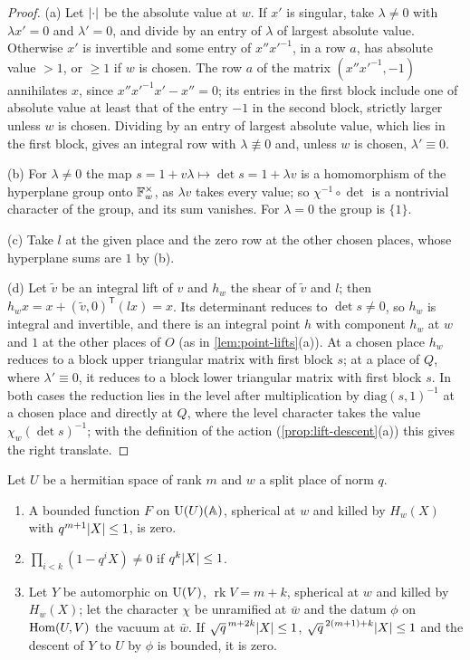 \begin{proof}
(a) Let $\lvert \cdot\rvert$ be the absolute value at $w$. If $x'$ is singular, take $\lambda\ne0$ with $\lambda x'=0$ and $\lambda'=0$, and divide by an entry of $\lambda$ of largest absolute value. Otherwise $x'$ is invertible and
some entry of $x''x'^{-1}$, in a row $a$, has absolute value $>1$, or $\ge1$ if $w$ is chosen. The row $a$ of the matrix $(x''x'^{-1},-1)$ annihilates $x$, since $x''x'^{-1}x'-x''=0$; its entries in the first block include
one of absolute value at least that of the entry $-1$ in the second block, strictly larger unless $w$ is chosen. Dividing by an entry of largest absolute value, which lies in the first block, gives an integral
row with $\lambda\not\equiv0$ and, unless $w$ is chosen, $\lambda'\equiv0$.

(b) For $\lambda\ne0$ the map $s=1+v\lambda\mapsto\det s=1+\lambda v$ is a homomorphism of the hyperplane group onto $\mathbb{F}_w^\times$, as $\lambda v$ takes every value; so $\chi^{-1}\circ\det$ is a nontrivial character of the group,
and its sum vanishes. For $\lambda=0$ the group is $\{1\}$.

(c) Take $l$ at the given place and the zero row at the other chosen places, whose hyperplane sums are $1$ by (b).

(d) Let $\tilde v$ be an integral lift of $v$ and $h_w$ the shear of $\tilde v$ and $l$; then $h_wx=x+(\tilde v,0)^{\mathsf T}(lx)=x$. Its determinant reduces to $\det s\ne0$, so $h_w$ is integral and invertible, and there is an integral
point $h$ with component $h_w$ at $w$ and $1$ at the other places of $O$ (as in \cref{lem:point-lifts}(a)). At a chosen place $h_w$ reduces to a block upper triangular matrix with first block $s$; at a place of $Q$, where
$\lambda'\equiv0$, it reduces to a block lower triangular matrix with first block $s$. In both cases the reduction lies in the level after multiplication by $\mathrm{diag}(s,1)^{-1}$ at a chosen place and directly at
$Q$, where the level character takes the value $\chi_w(\det s)^{-1}$; with the definition of the action (\cref{prop:lift-descent}(a)) this gives the right translate.
\end{proof}

\begin{lemma}\label{lem:small-roots}
Let $U$ be a hermitian space of rank $m$ and $w$ a split place of norm $q$.
\begin{enumerate}[label=\textup{(\alph*)}]
\item A bounded function $F$ on $\operatorname{U}(U)(\mathbb{A})$, spherical at $w$ and killed by $H_w(X)$ with $q^{m+1}\lvert X\rvert\le1$, is zero.
\item $\prod_{i<k}(1-q^iX)\ne0$ if $q^k\lvert X\rvert\le1$.
\item Let $Y$ be automorphic on $\operatorname{U}(V)$, $\operatorname{rk}V=m+k$, spherical at $w$ and killed by $H_w(X)$; let the character $\chi$ be unramified at $\bar w$ and the datum $\phi$ on $\operatorname{Hom}(U,V)$ the vacuum at $\bar w$. If
$\sqrt q^{\,m+2k}\lvert X\rvert\le1$, $\sqrt q^{\,2(m+1)+k}\lvert X\rvert\le1$ and the descent of $Y$ to $U$ by $\phi$ is bounded, it is zero.
\end{enumerate}
\end{lemma}

